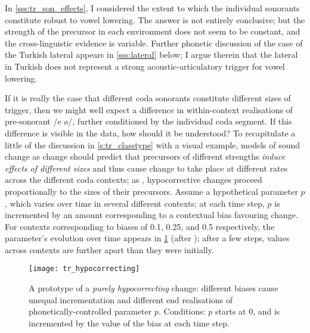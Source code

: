 In \cref{sss:tr_son_effects}, I considered the extent to which the individual sonorants constitute robust  to vowel lowering. The answer is not entirely conclusive; but the strength of the precursor in each environment does not seem to be constant, and the cross-linguistic evidence is variable. Further phonetic discussion of the case of the Turkish lateral appears in \cref{sss:lateral} below; I argue therein that the lateral in Turkish does not represent a strong acoustic-articulatory trigger for vowel lowering.

If it is really the case that different coda sonorants constitute different sizes of trigger, then we might well expect a difference in within-context realisations of pre-sonorant /e ø/, further conditioned by the individual coda segment. If this difference is visible in the data, how should it be understood? To recapitulate a little of the discussion in \cref{s:tr_classtype} with a visual example, models of sound change as  change \citep{Ohala1981} should predict that precursors of different strengths \emph{induce effects of different sizes} and thus cause change to take place at different rates across the different coda contexts; as \citet{Fruehwald2016}, hypocorrective changes proceed proportionally to the sizes of their precursors. Assume a hypothetical parameter $p$, which varies over time in several different contexts; at each time step, $p$ is incremented by an amount corresponding to a contextual bias favouring change. For contexts corresponding to biases of 0.1, 0.25, and 0.5 respectively, the parameter's evolution over time appears in \cref{fig:tr_hypo_example} (after \citealt[378]{Fruehwald2016}); after a few steps, values across contexts are further apart than they were initially.

\begin{figure}[H]
  \centering
  \texttt{[image: tr\_hypocorrecting]}
  \caption[A rough illustration of hypocorrection.]{A prototype of a \emph{purely hypocorrecting} change: different biases cause unequal incrementation and different end realisations of phonetically-controlled parameter $p$. Conditions: $p$ starts at 0, and is incremented by the value of the bias at each time step. }
  \label{fig:tr_hypo_example}
\end{figure}

